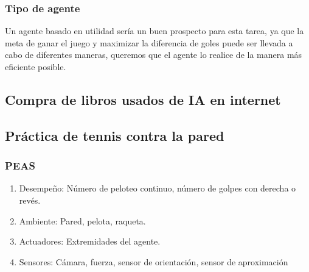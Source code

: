 \documentclass{article}
\begin{document}
            \subsubsection{Tipo de agente}
                Un agente basado en utilidad sería un buen prospecto para esta tarea, ya que la meta de ganar el juego y maximizar la diferencia de goles puede ser llevada a cabo de diferentes maneras, queremos que el agente lo realice de la manera más eficiente posible.


        \subsection{Compra de libros usados de IA en internet}
            
            \subsection{Práctica de tennis contra la pared}
            \subsubsection{PEAS}
            \begin{enumerate}
                \item Desempeño: Número de peloteo continuo, número de golpes con derecha o revés.
                \item Ambiente: Pared, pelota, raqueta.
                \item Actuadores: Extremidades del agente.
                \item Sensores: Cámara, fuerza, sensor de orientación, sensor de aproximación
            \end{enumerate}
\end{document}
